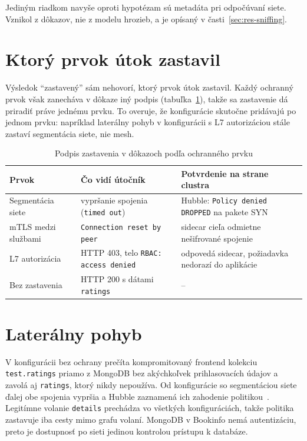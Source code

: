 Jediným riadkom navyše oproti hypotézam sú metadáta pri odpočúvaní siete. Vznikol z dôkazov, nie z modelu hrozieb, a je opísaný v časti~\ref{sec:res-sniffing}.

\section{Ktorý prvok útok zastavil}
\label{sec:res-signatures}

Výsledok \enquote{zastavený} sám nehovorí, ktorý prvok útok zastavil. Každý ochranný prvok však zanecháva v dôkaze iný podpis (tabuľka~\ref{tab:signatures}), takže sa zastavenie dá priradiť práve jednému prvku. To overuje, že konfigurácie skutočne pridávajú po jednom prvku: napríklad laterálny pohyb v konfigurácii s L7 autorizáciou stále zastaví segmentácia siete, nie mesh.

\begin{table}[ht!]
  \centering
  \caption{Podpis zastavenia v dôkazoch podľa ochranného prvku}
  \label{tab:signatures}
  \footnotesize
  \renewcommand{\arraystretch}{1.15}
  \begin{tabularx}{\textwidth}{@{}>{\raggedright\arraybackslash}p{3.3cm}>{\raggedright\arraybackslash}X>{\raggedright\arraybackslash}p{4.2cm}@{}}
    \toprule
    Prvok & Čo vidí útočník & Potvrdenie na strane clustra \\
    \midrule
    Segmentácia siete & vypršanie spojenia (\texttt{timed out}) & Hubble: \texttt{Policy denied DROPPED} na pakete SYN \\
    mTLS medzi službami & \texttt{Connection reset by peer} & sidecar cieľa odmietne nešifrované spojenie \\
    L7 autorizácia & HTTP 403, telo \texttt{RBAC: access denied} & odpovedá sidecar, požiadavka nedorazí do aplikácie \\
    Bez zastavenia & HTTP 200 s dátami \texttt{ratings} & -- \\
    \bottomrule
  \end{tabularx}
\end{table}

\section{Laterálny pohyb}

V konfigurácii bez ochrany prečíta kompromitovaný frontend kolekciu \texttt{test.ratings} priamo z MongoDB bez akýchkoľvek prihlasovacích údajov a zavolá aj \texttt{ratings}, ktorý nikdy nepoužíva. Od konfigurácie so segmentáciou siete ďalej obe spojenia vypršia a Hubble zaznamená ich zahodenie politikou~\cite{hubble}. Legitímne volanie \texttt{details} prechádza vo všetkých konfiguráciách, takže politika zastavuje iba cesty mimo grafu volaní. MongoDB v Bookinfo nemá autentizáciu, preto je dostupnosť po sieti jedinou kontrolou prístupu k databáze.

